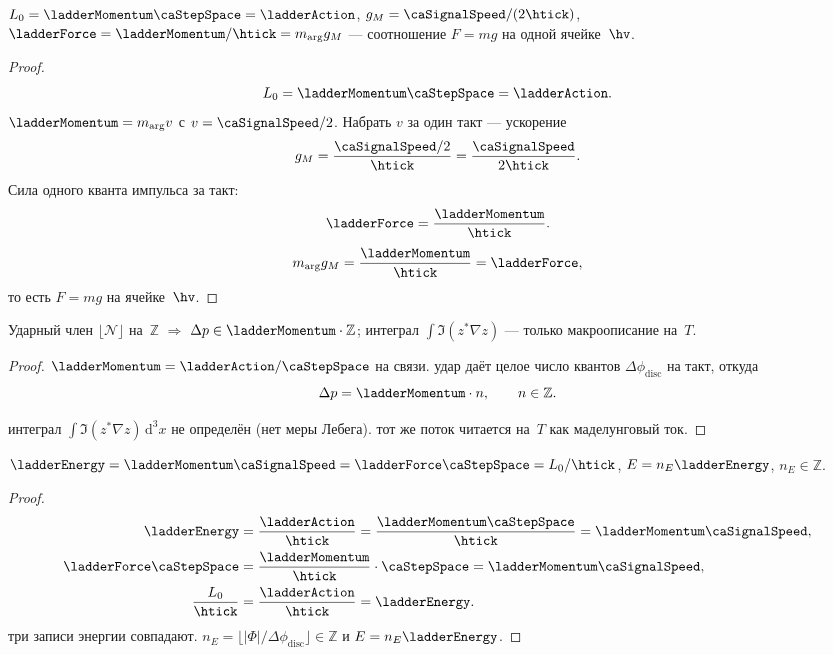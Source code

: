 \begin{lemma}[5.1c]
\label{lem:51c}
$L_0=\ladderMomentum\caStepSpace=\ladderAction$, $g_M=\caSignalSpeed/(2\htick)$, $\ladderForce=\ladderMomentum/\htick=m_{\arg} g_M$ ---
соотношение $F=mg$ на одной ячейке~$\hv$.
\end{lemma}

\begin{proof}
\[
  L_0=\ladderMomentum\caStepSpace=\ladderAction.
\]
$\ladderMomentum=m_{\arg} v$ с $v=\caSignalSpeed/2$.
Набрать $v$ за один такт --- ускорение
\[
  g_M=\frac{\caSignalSpeed/2}{\htick}=\frac{\caSignalSpeed}{2\htick}.
\]
Сила одного кванта импульса за такт:
\[
  \ladderForce=\frac{\ladderMomentum}{\htick}.
\]
\[
  m_{\arg} g_M=\frac{\ladderMomentum}{\htick}=\ladderForce,
\]
то есть $F=mg$ на ячейке~$\hv$.
\end{proof}

\begin{lemma}[5.1d]
\label{lem:51d}
Ударный член $\lfloor\mathcal{N}\rfloor$ на~$\mathbb{Z}$ $\Rightarrow$ $\Delta p\in \ladderMomentum\cdot\mathbb{Z}$;
интеграл $\int\Im(z^*\nabla z)$ --- только макроописание на~$T$.
\end{lemma}

\begin{proof}
$\ladderMomentum=\ladderAction/\caStepSpace$ на связи.
удар даёт целое число квантов $\Delta\phi_{\mathrm{disc}}$ на такт, откуда
\[
  \Delta p=\ladderMomentum\cdot n,\qquad n\in\mathbb{Z}.
\]

\smallskip
{}
интеграл $\int\Im(z^*\nabla z)\,\mathrm{d}^3x$ не определён (нет меры Лебега).
тот же поток читается на~$T$ как маделунговый ток.
\end{proof}

\begin{lemma}[5.1e]
\label{lem:51e}
$\ladderEnergy=\ladderMomentum \caSignalSpeed=\ladderForce\caStepSpace=L_0/\htick$, $E=n_E \ladderEnergy$, $n_E\in\mathbb{Z}$.
\end{lemma}

\begin{proof}
\begin{align*}
  \ladderEnergy&=\frac{\ladderAction}{\htick}=\frac{\ladderMomentum\caStepSpace}{\htick}=\ladderMomentum \caSignalSpeed,\\
  \ladderForce\caStepSpace&=\frac{\ladderMomentum}{\htick}\cdot\caStepSpace=\ladderMomentum \caSignalSpeed,\\
  \frac{L_0}{\htick}&=\frac{\ladderAction}{\htick}=\ladderEnergy.
\end{align*}
\pfollows
три записи энергии совпадают.
$n_E=\lfloor|\Phi|/\Delta\phi_{\mathrm{disc}}\rfloor\in\mathbb{Z}$ и $E=n_E \ladderEnergy$.
\end{proof}

